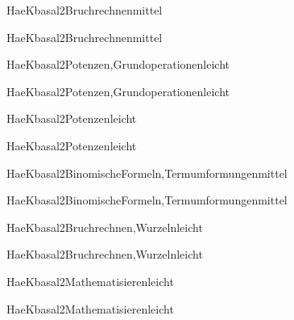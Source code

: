 \documentclass[12pt]{article}
\begin{document}
\begin{Add}{HaeK}{basal2}{Bruchrechnen}{mittel}
\solution{ }
\end{Add}
\begin{Add}{HaeK}{basal2}{Bruchrechnen}{mittel}
\end{Add}

\begin{Add}{HaeK}{basal2}{Potenzen,Grundoperationen}{leicht}
\solution{ }
\end{Add}
\begin{Add}{HaeK}{basal2}{Potenzen,Grundoperationen}{leicht}
\end{Add}

\begin{Add}{HaeK}{basal2}{Potenzen}{leicht}
\solution{ }
\end{Add}
\begin{Add}{HaeK}{basal2}{Potenzen}{leicht}
\end{Add}

\begin{Add}{HaeK}{basal2}{BinomischeFormeln,Termumformungen}{mittel}
\solution{ }
\end{Add}
\begin{Add}{HaeK}{basal2}{BinomischeFormeln,Termumformungen}{mittel}
\end{Add}

\begin{Add}{HaeK}{basal2}{Bruchrechnen,Wurzeln}{leicht}
\solution{ }
\end{Add}
\begin{Add}{HaeK}{basal2}{Bruchrechnen,Wurzeln}{leicht}
\end{Add}

\begin{Add}{HaeK}{basal2}{Mathematisieren}{leicht}
\solution{ }
\end{Add}
\begin{Add}{HaeK}{basal2}{Mathematisieren}{leicht}
\end{Add}
\end{document}

